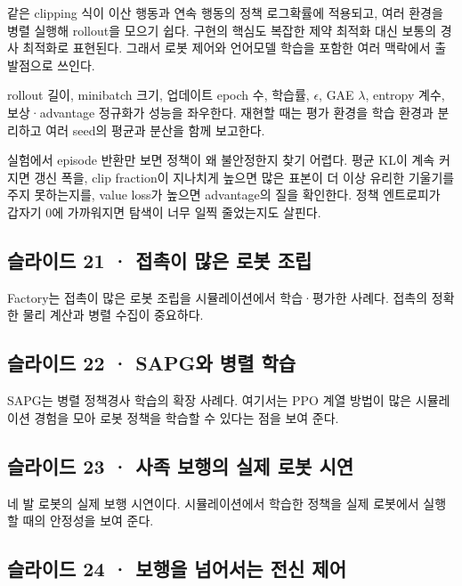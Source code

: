 \documentclass[11pt,a4paper]{article}
\begin{document}
같은 clipping 식이 이산 행동과 연속 행동의 정책 로그확률에 적용되고, 여러 환경을 병렬 실행해 rollout을 모으기 쉽다. 구현의 핵심도 복잡한 제약 최적화 대신 보통의 경사 최적화로 표현된다. 그래서 로봇 제어와 언어모델 학습을 포함한 여러 맥락에서 출발점으로 쓰인다.\par

rollout 길이, minibatch 크기, 업데이트 epoch 수, 학습률, $\epsilon$, GAE $\lambda$, entropy 계수, 보상·advantage 정규화가 성능을 좌우한다. 재현할 때는 평가 환경을 학습 환경과 분리하고 여러 seed의 평균과 분산을 함께 보고한다.\par

실험에서 episode 반환만 보면 정책이 왜 불안정한지 찾기 어렵다. 평균 KL이 계속 커지면 갱신 폭을, clip fraction이 지나치게 높으면 많은 표본이 더 이상 유리한 기울기를 주지 못하는지를, value loss가 높으면 advantage의 질을 확인한다. 정책 엔트로피가 갑자기 0에 가까워지면 탐색이 너무 일찍 줄었는지도 살핀다.\par

\subsection{슬라이드 21 · 접촉이 많은 로봇 조립}

Factory는 접촉이 많은 로봇 조립을 시뮬레이션에서 학습·평가한 사례다. 접촉의 정확한 물리 계산과 병렬 수집이 중요하다.\par

\subsection{슬라이드 22 · SAPG와 병렬 학습}

SAPG는 병렬 정책경사 학습의 확장 사례다. 여기서는 PPO 계열 방법이 많은 시뮬레이션 경험을 모아 로봇 정책을 학습할 수 있다는 점을 보여 준다.\par

\subsection{슬라이드 23 · 사족 보행의 실제 로봇 시연}

네 발 로봇의 실제 보행 시연이다. 시뮬레이션에서 학습한 정책을 실제 로봇에서 실행할 때의 안정성을 보여 준다.\par

\subsection{슬라이드 24 · 보행을 넘어서는 전신 제어}
\end{document}
